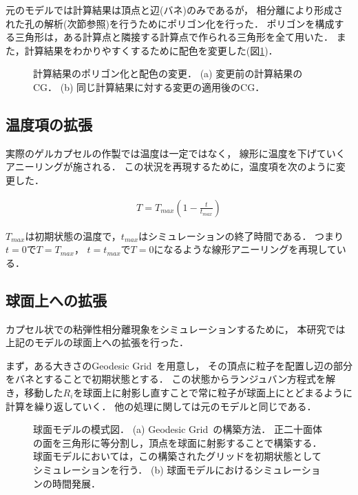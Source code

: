 元のモデルでは計算結果は頂点と辺(バネ)のみであるが，
相分離により形成された孔の解析(次節参照)を行うためにポリゴン化を行った．
ポリゴンを構成する三角形は，ある計算点と隣接する計算点で作られる三角形を全て用いた．
また，計算結果をわかりやすくするために配色を変更した(図\ref{fig:model_2d})．

\begin{figure}
\centering

\caption{
    計算結果のポリゴン化と配色の変更．
    (a) 変更前の計算結果のCG．
    (b) 同じ計算結果に対する変更の適用後のCG．
}
\label{fig:model_2d}
\end{figure}


\subsection{温度項の拡張}
実際のゲルカプセルの作製では温度は一定ではなく，
線形に温度を下げていくアニーリングが施される．
この状況を再現するために，温度項を次のように変更した．

\begin{eqnarray}
\label{eq:thermal}
T = T_{max}(1-\frac{t}{t_{max}})
\end{eqnarray}

$T_{max}$は初期状態の温度で，$t_{max}$はシミュレーションの終了時間である．
つまり$t=0$で$T=T_{max}$，
$t=t_{max}$で$T=0$になるような線形アニーリングを再現している．


\subsection{球面上への拡張}
カプセル状での粘弾性相分離現象をシミュレーションするために，
本研究では上記のモデルの球面上への拡張を行った．

まず，ある大きさのGeodesic Grid~\cite{Geodesic}を用意し，
その頂点に粒子を配置し辺の部分をバネとすることで初期状態とする．
この状態からランジュバン方程式を解き，移動した$R_i$を球面上に射影し直すことで常に粒子が球面上にとどまるように計算を繰り返していく．
他の処理に関しては元のモデルと同じである．

\begin{figure}
\centering

\caption{
    球面モデルの模式図．
    (a) Geodesic Grid~\cite{Geodesic}の構築方法．
        正二十面体の面を三角形に等分割し，頂点を球面に射影することで構築する．
        球面モデルにおいては，この構築されたグリッドを初期状態としてシミュレーションを行う．
    (b) 球面モデルにおけるシミュレーションの時間発展．
}
\label{fig:model_sphere}
\end{figure}



